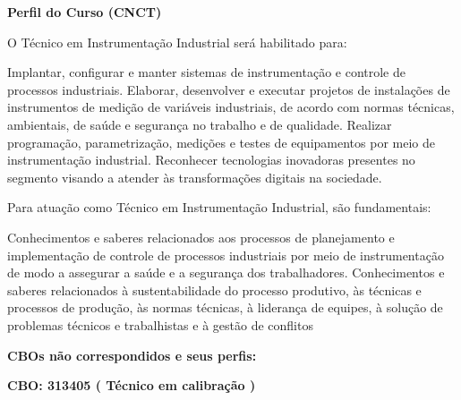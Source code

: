 \documentclass[
]{article}
\begin{document}
\textbf{Perfil do Curso (CNCT)}

O Técnico em Instrumentação Industrial será habilitado para:

Implantar, configurar e manter sistemas de instrumentação e controle de
processos industriais. Elaborar, desenvolver e executar projetos de
instalações de instrumentos de medição de variáveis industriais, de
acordo com normas técnicas, ambientais, de saúde e segurança no trabalho
e de qualidade. Realizar programação, parametrização, medições e testes
de equipamentos por meio de instrumentação industrial. Reconhecer
tecnologias inovadoras presentes no segmento visando a atender às
transformações digitais na sociedade.

Para atuação como Técnico em Instrumentação Industrial, são
fundamentais:

Conhecimentos e saberes relacionados aos processos de planejamento e
implementação de controle de processos industriais por meio de
instrumentação de modo a assegurar a saúde e a segurança dos
trabalhadores. Conhecimentos e saberes relacionados à sustentabilidade
do processo produtivo, às técnicas e processos de produção, às normas
técnicas, à liderança de equipes, à solução de problemas técnicos e
trabalhistas e à gestão de conflitos

\textbf{CBOs não correspondidos e seus perfis:}

\textbf{CBO: 313405  ( Técnico em calibração )}
\end{document}
